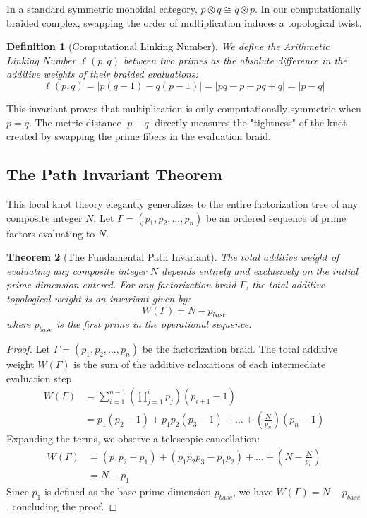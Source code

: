 \documentclass[11pt, a4paper]{article}
\newtheorem{theorem}{Theorem}[section]
\newtheorem{definition}[theorem]{Definition}
\begin{document}
In a standard symmetric monoidal category, $p \otimes q \cong q \otimes p$. In our computationally braided complex, swapping the order of multiplication induces a topological twist. 

\begin{definition}[Computational Linking Number]
We define the Arithmetic Linking Number $\ell(p,q)$ between two primes as the absolute difference in the additive weights of their braided evaluations:
\[
\ell(p, q) = | p(q-1) - q(p-1) | = | pq - p - pq + q | = | p - q |
\]
\end{definition}

This invariant proves that multiplication is only computationally symmetric when $p = q$. The metric distance $|p-q|$ directly measures the "tightness" of the knot created by swapping the prime fibers in the evaluation braid.

\subsection{The Path Invariant Theorem}

This local knot theory elegantly generalizes to the entire factorization tree of any composite integer $N$. Let $\Gamma = (p_1, p_2, \dots, p_n)$ be an ordered sequence of prime factors evaluating to $N$. 

\begin{theorem}[The Fundamental Path Invariant]
The total additive weight of evaluating any composite integer $N$ depends entirely and exclusively on the initial prime dimension entered. For any factorization braid $\Gamma$, the total additive topological weight is an invariant given by:
\[
W(\Gamma) = N - p_{base}
\]
where $p_{base}$ is the first prime in the operational sequence.
\end{theorem}

\begin{proof}
Let $\Gamma = (p_1, p_2, \dots, p_n)$ be the factorization braid. The total additive weight $W(\Gamma)$ is the sum of the additive relaxations of each intermediate evaluation step. 
\begin{align*}
W(\Gamma) &= \sum_{i=1}^{n-1} \left( \prod_{j=1}^{i} p_j \right) (p_{i+1} - 1) \\
&= p_1(p_2 - 1) + p_1p_2(p_3 - 1) + \dots + \left(\frac{N}{p_n}\right)(p_n - 1)
\end{align*}
Expanding the terms, we observe a telescopic cancellation:
\begin{align*}
W(\Gamma) &= (p_1p_2 - p_1) + (p_1p_2p_3 - p_1p_2) + \dots + \left(N - \frac{N}{p_n}\right) \\
&= N - p_1
\end{align*}
Since $p_1$ is defined as the base prime dimension $p_{base}$, we have $W(\Gamma) = N - p_{base}$, concluding the proof.
\end{proof}
\end{document}
